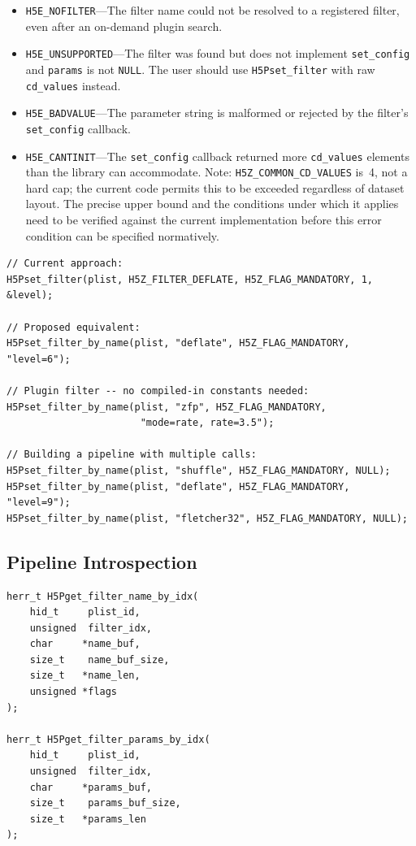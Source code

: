 \documentclass[../HDF5_RFC.tex]{subfiles}
\begin{document}
\begin{itemize}
\item \texttt{H5E\_NOFILTER}---The filter name could not be resolved to a registered
  filter, even after an on-demand plugin search.
\item \texttt{H5E\_UNSUPPORTED}---The filter was found but does not implement
  \texttt{set\_config} and \texttt{params} is not \texttt{NULL}. The user should use
  \texttt{H5Pset\_filter} with raw \texttt{cd\_values} instead.
\item \texttt{H5E\_BADVALUE}---The parameter string is malformed or rejected by the
  filter's \texttt{set\_config} callback.
\item \texttt{H5E\_CANTINIT}---The \texttt{set\_config} callback returned more
  \texttt{cd\_values} elements than the library can accommodate.
  Note: \texttt{H5Z\_COMMON\_CD\_VALUES} is~4, not a hard cap; the current code
  permits this to be exceeded regardless of dataset layout.  The precise
  upper bound and the conditions under which it applies need to be
  verified against the current implementation before this error condition
  can be specified normatively.
\end{itemize}


\begin{verbatim}
// Current approach:
H5Pset_filter(plist, H5Z_FILTER_DEFLATE, H5Z_FLAG_MANDATORY, 1, &level);

// Proposed equivalent:
H5Pset_filter_by_name(plist, "deflate", H5Z_FLAG_MANDATORY, "level=6");

// Plugin filter -- no compiled-in constants needed:
H5Pset_filter_by_name(plist, "zfp", H5Z_FLAG_MANDATORY,
                       "mode=rate, rate=3.5");

// Building a pipeline with multiple calls:
H5Pset_filter_by_name(plist, "shuffle", H5Z_FLAG_MANDATORY, NULL);
H5Pset_filter_by_name(plist, "deflate", H5Z_FLAG_MANDATORY, "level=9");
H5Pset_filter_by_name(plist, "fletcher32", H5Z_FLAG_MANDATORY, NULL);
\end{verbatim}


\subsection{Pipeline Introspection}
\label{sec:introspection}

\begin{verbatim}
herr_t H5Pget_filter_name_by_idx(
    hid_t     plist_id,
    unsigned  filter_idx,
    char     *name_buf,
    size_t    name_buf_size,
    size_t   *name_len,
    unsigned *flags
);

herr_t H5Pget_filter_params_by_idx(
    hid_t     plist_id,
    unsigned  filter_idx,
    char     *params_buf,
    size_t    params_buf_size,
    size_t   *params_len
);
\end{verbatim}
\end{document}
